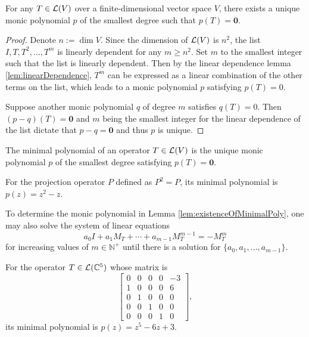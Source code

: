 \begin{lem}
  \label{lem:existenceOfMinimalPoly}
  For any $T\in{\cal L}(V)$ over a finite-dimensional vector space $V$,
  there exists a unique monic polynomial $p$
  of the smallest degree such that $p(T)=\mathbf{0}$.
\end{lem}
\begin{proof}
  Denote $n:=\dim V$. Since the dimension of ${\cal L}(V)$ is $n^2$,
  the list $I, T, T^2, \ldots, T^m$
  is linearly dependent for any $m\ge n^2$.
  Set $m$ to the smallest integer such that the list is linearly
  dependent.
  Then by the linear dependence lemma  \ref{lem:linearDependence},
  $T^m$ can be expressed as a linear combination of
  the other terms on the list,
  which leads to a monic polynomial $p$ satisfying $p(T)=0$.
  
  Suppose another monic polynomial $q$ of degree $m$
  satisfies $q(T)=0$.
  Then $(p-q)(T)=\mathbf{0}$ and $m$ being the smallest integer
  for the linear dependence of the list
  dictate that $p-q=\mathbf{0}$
  and thus $p$ is unique.
\end{proof}

\begin{defn}
  \label{def:minimalPoly}
  The minimal polynomial of an operator $T\in{\cal L}(V)$
  is the unique monic polynomial $p$ of the smallest degree
  satisfying $p(T)=\mathbf{0}$.
\end{defn}

\begin{exm}
  For the projection operator $P$ defined as $P^2=P$,
  its minimal polynomial is $p(z)=z^2-z$.
\end{exm}

\begin{rem}
  \label{rem:findingDegreeOfMinimalPoly}
  To determine the monic polynomial in Lemma
  \ref{lem:existenceOfMinimalPoly},
  one may also solve the system of linear equations
  \begin{displaymath}
    a_0 I + a_1 M_T + \cdots + a_{m-1} M_T^{m-1} = - M_T^m
  \end{displaymath}
  for increasing values of $m\in\mathbb{N}^+$
  until there is a solution for $\{a_0, a_1, \ldots, a_{m-1}\}$. 
\end{rem}

\begin{exm}
  \label{exm:minimalPolyC5}
  For the operator $T\in {\cal L}(\mathbb{C}^5)$ whose matrix is
  \begin{displaymath}
    \begin{bmatrix}
      0 & 0 & 0 & 0 & -3
      \\
      1 & 0 & 0 & 0 & 6
      \\
      0 & 1 & 0 & 0 & 0
      \\
      0 & 0 & 1 & 0 & 0
      \\
      0 & 0 & 0 & 1 & 0
    \end{bmatrix},
  \end{displaymath}
  its minimal polynomial is $p(z)=z^5-6z+3$.
\end{exm}

